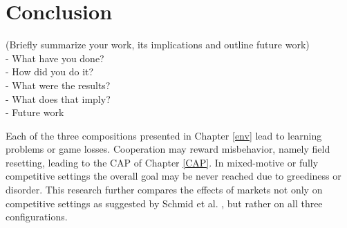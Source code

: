 %
%
\chapter{Conclusion}\label{sec:Conclusion}
(Briefly summarize your work, its implications and outline future work) \\
- What have you done? \\
- How did you do it? \\
- What were the results? \\
- What does that imply? \\
- Future work

Each of the three compositions presented in Chapter \ref{env} lead to learning problems or game losses. Cooperation may reward misbehavior, namely field resetting, leading to the CAP of Chapter \ref{CAP}. In mixed-motive or fully competitive settings the overall goal may be never reached due to greediness or disorder. This research further compares the effects of markets not only on competitive settings as suggested by Schmid et al. \cite{scbe21}, but rather on all three configurations.
